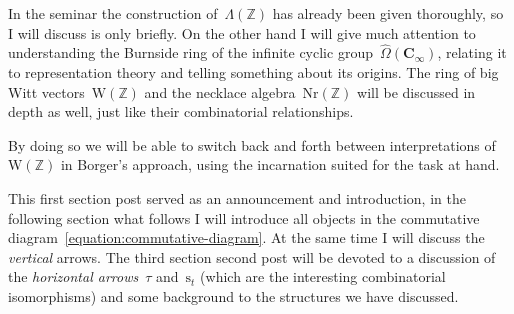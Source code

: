 In the seminar the construction of~$\Lambda(\mathbb{Z})$ has already been given thoroughly, so I will discuss is only briefly. On the other hand I will give much attention to understanding the Burnside ring of the infinite cyclic group~$\hat{\Omega}(\mathbf{C}_\infty)$, relating it to representation theory and telling something about its origins. The ring of big Witt vectors~$\mathrm{W}(\mathbb{Z})$ and the necklace algebra~$\mathrm{Nr}(\mathbb{Z})$ will be discussed in depth as well, just like their combinatorial relationships.

By doing so we will be able to switch back and forth between interpretations of~$\mathrm{W}(\mathbb{Z})$ in Borger's approach, using the incarnation suited for the task at hand.

This first \iftex section \fi\ifblog post \fi served as an announcement and introduction, in \iftex the following section \fi\ifblog what follows \fi I will introduce all objects in the commutative diagram~\eqref{equation:commutative-diagram}. At the same time I will discuss the \emph{vertical} arrows. The \iftex third section \fi\ifblog second post \fi will be devoted to a discussion of the \emph{horizontal arrows}~$\tau$ and~$\mathrm{s}_t$ (which are the interesting combinatorial isomorphisms) and some background to the structures we have discussed.

